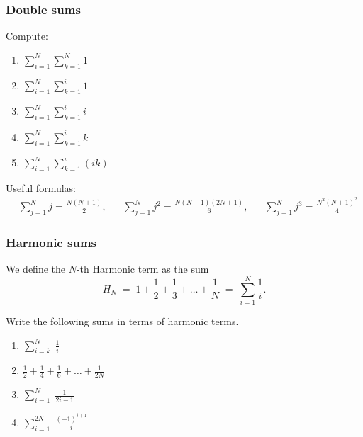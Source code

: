 \documentclass[14pt]{beamer}
\begin{document}
	\begin{frame}[t]
		\frametitle{Double sums}

		Compute:
		\begin{multicols}{3}
			\begin{enumerate}
				\item $\displaystyle \sum_{i=1}^{N}\sum_{k=1}^{N}1$

				\item $\displaystyle \sum_{i=1}^{N}\sum_{k=1}^{i}1$

				\item $\displaystyle \sum_{i=1}^{N}\sum_{k=1}^{i}i$

				\item $\displaystyle \sum_{i=1}^{N}\sum_{k=1}^{i}k$

				\item $\displaystyle \sum_{i=1}^{N}\sum_{k=1}^{i}(ik)$
			\end{enumerate}
		\end{multicols}

		\vfill

		{\fontsize{10}{10}\selectfont Useful formulas: \begin{align*}&\sum_{j=1}^{N}j = \frac{N(N+1)}{2},&&\sum_{j=1}^{N}j^{2}= \frac{N(N+1)(2N+1)}{6},&&\sum_{j=1}^{N}j^{3}= \frac{N^{2}(N+1)^{2}}{4}\end{align*} }
	\end{frame}

	\begin{frame}[t]
		\fontsize{13}{13}\selectfont
		\frametitle{Harmonic sums}

		We define the $N$-th Harmonic term as the sum
		\[
			H_{N}\; = \; 1 + \frac{1}{2}+ \frac{1}{3}+ \ldots + \frac{1}{N}\; = \; \sum
			_{i=1}^{N}\frac{1}{i}.
		\]

		Write the following sums in terms of harmonic terms.

		\begin{multicols}{2}
			\begin{enumerate}
				\item $\displaystyle \sum_{i=k}^{N}\; \frac{1}{i}$

				\item $\displaystyle \frac{1}{2}+ \frac{1}{4}+ \frac{1}{6}+ \ldots + \frac{1}{2N}$

				\item $\displaystyle \sum_{i=1}^{N}\; \frac{1}{2i-1}$

				\item $\displaystyle \sum_{i=1}^{2N}\; \frac{(-1)^{i+1}}{i}$
			\end{enumerate}
		\end{multicols}
	\end{frame}
\end{document}
